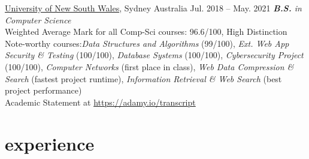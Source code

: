 \documentclass[hidelinks__VERSION__]{adamyi-cv}
\begin{document}
\begin{entrylist}


\entry
{\href{https://unsw.edu.au}{University of New South Wales}, Sydney Australia}
{Jul. 2018 -- May. 2021}
{\emph{\textbf{B.S.} in Computer Science}\\
Weighted Average Mark for all Comp-Sci courses: 96.6/100, High Distinction\\
  Note-worthy courses:\emph{Data Structures and Algorithms} (99/100), \emph{Ext. Web App Security \& Testing} (100/100), \emph{Database Systems} (100/100), \emph{Cybersecurity Project} (100/100), \emph{Computer Networks} (first place in class), \emph{Web Data Compression \& Search} (fastest project runtime), \emph{Information Retrieval \& Web Search} (best project performance)\\
Academic Statement at \href{https://adamy.io/transcript}{https://adamy.io/transcript}
}

\end{entrylist}


\section{experience}
\end{document}
